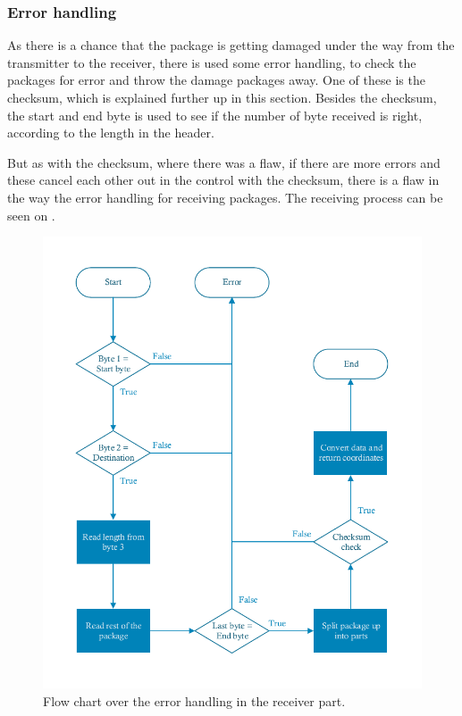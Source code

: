\subsubsection{Error handling}
As there is a chance that the package is getting damaged under the way from the transmitter to the receiver, there is used some error handling, to check the packages for error and throw the damage packages away. One of these is the checksum, which is explained further up in this section. Besides the checksum, the start and end byte is used to see if the number of byte received is right, according to the length in the header.

But as with the checksum, where there was a flaw, if there are more errors and these cancel each other out in the control with the checksum, there is a flaw in the way the error handling for receiving packages. The receiving process can be seen on .

\begin{figure}[H]
\centering
\includegraphics[scale=0.7]{figures/FlowReceiver.pdf}
\caption{Flow chart over the error handling in the receiver part.}
\label{FlowReceiver}
\end{figure}

